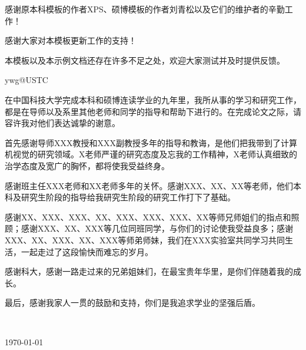
\begin{thanks}

感谢原本科模板的作者XPS、硕博模板的作者刘青松以及它们的维护者的辛勤工作！

感谢大家对本模板更新工作的支持！

本模板以及本示例文档还存在许多不足之处，欢迎大家测试并及时提供反馈。

\begin{flushright}
ywg@USTC
\end{flushright}


在中国科技大学完成本科和硕博连读学业的九年里，我所从事的学习和研究工作，都是在导师以及系里其他老师和同学的指导和帮助下进行的。在完成论文之际，请容许我对他们表达诚挚的谢意。

首先感谢导师XXX教授和XXX副教授多年的指导和教诲，是他们把我带到了计算机视觉的研究领域。X老师严谨的研究态度及忘我的工作精神，X老师认真细致的治学态度及宽广的胸怀，都将使我受益终身。

感谢班主任XXX老师和XX老师多年的关怀。感谢XXX、XX、XX等老师，他们本科及研究生阶段的指导给我研究生阶段的研究工作打下了基础。

感谢XX、XXX、XXX、XX、XXX、XXX、XXX、XX等师兄师姐们的指点和照顾；感谢XXX、XX、XXX等几位同班同学，与你们的讨论使我受益良多；感谢XXX、XX、XXX、XX、XXX等师弟师妹，我们在XXX实验室共同学习共同生活，一起走过了这段愉快而难忘的岁月。

感谢科大，感谢一路走过来的兄弟姐妹们，在最宝贵年华里，是你们伴随着我的成长。

最后，感谢我家人一贯的鼓励和支持，你们是我追求学业的坚强后盾。

\vskip 18pt

\begin{flushright}

~~~~\ustc@author~~~~

\today

\end{flushright}

\end{thanks}
